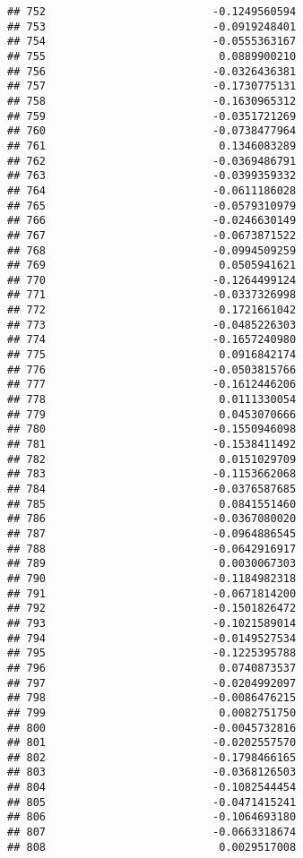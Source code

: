 \documentclass[
]{article}
\begin{document}
\begin{verbatim}
## 752                          -0.1249560594
## 753                          -0.0919248401
## 754                          -0.0555363167
## 755                           0.0889900210
## 756                          -0.0326436381
## 757                          -0.1730775131
## 758                          -0.1630965312
## 759                          -0.0351721269
## 760                          -0.0738477964
## 761                           0.1346083289
## 762                          -0.0369486791
## 763                          -0.0399359332
## 764                          -0.0611186028
## 765                          -0.0579310979
## 766                          -0.0246630149
## 767                          -0.0673871522
## 768                          -0.0994509259
## 769                           0.0505941621
## 770                          -0.1264499124
## 771                          -0.0337326998
## 772                           0.1721661042
## 773                          -0.0485226303
## 774                          -0.1657240980
## 775                           0.0916842174
## 776                          -0.0503815766
## 777                          -0.1612446206
## 778                           0.0111330054
## 779                           0.0453070666
## 780                          -0.1550946098
## 781                          -0.1538411492
## 782                           0.0151029709
## 783                          -0.1153662068
## 784                          -0.0376587685
## 785                           0.0841551460
## 786                          -0.0367080020
## 787                          -0.0964886545
## 788                          -0.0642916917
## 789                           0.0030067303
## 790                          -0.1184982318
## 791                          -0.0671814200
## 792                          -0.1501826472
## 793                          -0.1021589014
## 794                          -0.0149527534
## 795                          -0.1225395788
## 796                           0.0740873537
## 797                          -0.0204992097
## 798                          -0.0086476215
## 799                           0.0082751750
## 800                          -0.0045732816
## 801                          -0.0202557570
## 802                          -0.1798466165
## 803                          -0.0368126503
## 804                          -0.1082544454
## 805                          -0.0471415241
## 806                          -0.1064693180
## 807                          -0.0663318674
## 808                           0.0029517008

\end{verbatim}
\end{document}
